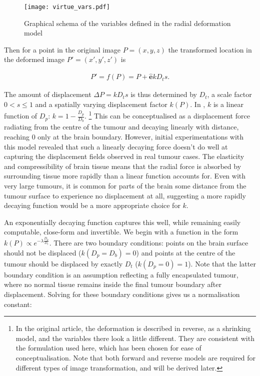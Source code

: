 \begin{figure}[htp]
  \centering
  \texttt{[image: virtue\_vars.pdf]}
  \caption{Graphical schema of the variables defined in the radial deformation model}
  \label{fig:virtue}
\end{figure}

Then for a point in the original image $P = (x,y,z)$ the transformed location in the deformed image $P' = (x',y',z')$ is

\begin{align}\label{eq:forwardP}
  P' = f(P) = P + \mathbf{\hat{e}}kD_ts.
\end{align}

The amount of displacement $\Delta P = kD_ts$ is thus determined by $D_t$, a scale factor $0<s \leq 1$ and a spatially varying displacement factor $k(P)$.
In \textcite{Nowinski2005}, $k$ is a linear function of $D_p$: $k = 1-\frac{D_p}{D_b}$. \footnote[2]{In the original \textcite{Nowinski2005} article, the deformation is described in reverse, as a shrinking model, and the variables there look a little different. They are consistent with the formulation used here, which has been chosen for ease of conceptualisation. Note that both forward and reverse models are required for different types of image transformation, and will be derived later.}
This can be conceptualised as a displacement force radiating from the centre of the tumour and decaying linearly with distance, reaching 0 only at the brain boundary.
However, initial experimentations with this model revealed that such a linearly decaying force doesn't do well at capturing the displacement fields observed in real tumour cases.
The elasticity and compressibility of brain tissue means that the radial force is absorbed by surrounding tissue more rapidly than a linear function accounts for.
Even with very large tumours, it is common for parts of the brain some distance from the tumour surface to experience no displacement at all, suggesting a  more rapidly decaying function would be a more appropriate choice for $k$.

An exponentially decaying function captures this well, while remaining easily computable, close-form and invertible.
We begin with a function in the form $k(P) \propto e^{-\lambda \frac{D_p}{D_t}}$.
There are two boundary conditions: points on the brain surface should not be displaced ($k(D_p = D_b) = 0$) and points at the centre of the tumour should be displaced by exactly $D_t$ ($k(D_p = 0) = 1$).
Note that the latter boundary condition is an assumption reflecting a fully encapsulated tumour, where no normal tissue remains inside the final tumour boundary after displacement.
Solving for these boundary conditions gives us a normalisation constant:

